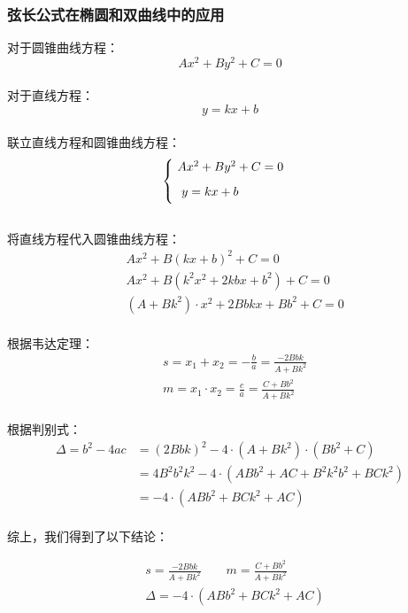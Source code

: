 \documentclass[UTF8]{ctexart}
\begin{document}
\subsubsection{弦长公式在椭圆和双曲线中的应用}
    对于圆锥曲线方程：
    \setcounter{equation}{0}
    \begin{equation}
        Ax^2+By^2+C=0
    \end{equation}\\
    对于直线方程：
    \begin{equation}
        y=kx+b
    \end{equation}\\
    联立直线方程和圆锥曲线方程：
    \begin{equation}
        \begin{cases}
            \ Ax^2+By^2+C=0\\[2mm]
            \ ~y=kx+b\vspace{3pt}
        \end{cases}
    \end{equation}\\[1mm]
    将直线方程代入圆锥曲线方程：
    \begin{align}
        &Ax^2+B(kx+b)^2+C=0\\[3mm]
        &Ax^2+B(k^2x^2+2kbx+b^2)+C=0\\[3mm]
        &(A+Bk^2)\cdot x^2+2Bbkx+Bb^2+C=0
    \end{align}\\
    根据韦达定理：
    \begin{align}
        &s=x_1+x_2=-\frac{b}{a}=\frac{-2Bbk}{A+Bk^2}\\[4mm]
        &m=x_1\cdot x_2=\frac{c}{a}=\frac{C+Bb^2}{A+Bk^2}
    \end{align}\\
    根据判别式：
    \begin{align}
        \Delta=b^2-4ac&=(2Bbk)^2-4\cdot\left(A+Bk^2\right)\cdot\left(Bb^2+C\right)\\[3mm]
        &=4B^2b^2k^2-4\cdot\left(ABb^2+AC+B^2k^2b^2+BCk^2\right)\\[3mm]
        &=-4\cdot\left(ABb^2+BCk^2+AC\right)
    \end{align}\\
    综上，我们得到了以下结论：
    \begin{large}
        \begin{align}
            &s=\frac{-2Bbk}{A+Bk^2}\qquad m=\frac{C+Bb^2}{A+Bk^2}\\[4mm]
            &\Delta=-4\cdot\left(ABb^2+BCk^2+AC\right)
        \end{align}
    \end{large}
\end{document}
